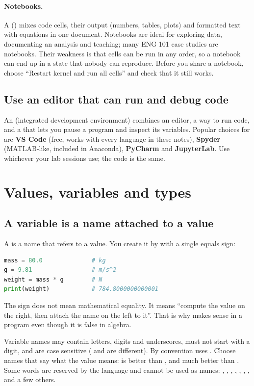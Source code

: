 \paragraph{Notebooks.} A  () mixes code cells,
their output (numbers, tables, plots) and formatted text with equations in one document.
Notebooks are ideal for exploring data, documenting an analysis and teaching; many ENG
101 case studies are notebooks. Their weakness is that cells can be run in any order, so
a notebook can end up in a state that nobody can reproduce. Before you share a notebook,
choose ``Restart kernel and run all cells'' and check that it still works.

\subsection*{Use an editor that can run and debug code}

An  (integrated development environment) combines an editor, a way to run code,
and a  that lets you pause a program and inspect its variables. Popular
choices for \py are \textbf{VS Code} (free, works with every language in these notes),
\textbf{Spyder} (MATLAB-like, included in Anaconda), \textbf{PyCharm} and
\textbf{JupyterLab}. Use whichever your lab sessions use; the code is the same.

\section{Values, variables and types}

\subsection*{A variable is a name attached to a value}

A  is a name that refers to a value. You create it by 
with a single equals sign:
\begin{lstlisting}[language=Python]
mass = 80.0              # kg
g = 9.81                 # m/s^2
weight = mass * g        # N
print(weight)            # 784.8000000000001
\end{lstlisting}
The \code{=} sign does not mean mathematical equality. It means ``compute the value on
the right, then attach the name on the left to it''. That is why  makes
sense in a program even though it is false in algebra.

Variable names may contain letters, digits and underscores, must not start with a digit,
and are case sensitive ( and  are different). By convention \py
uses . Choose names that say what the value means:
 is better than , and much better than . Some words are
reserved by the language and cannot be used as names: , , ,
, , , , and a few others.

